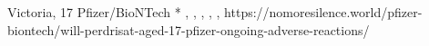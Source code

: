          {Victoria, }
          {17}
          {Pfizer/BioNTech}
          {*}
          {
            ,
            ,
            ,
            ,
            ,
          }
          {https://nomoresilence.world/pfizer-biontech/will-perdrisat-aged-17-pfizer-ongoing-adverse-reactions/}

